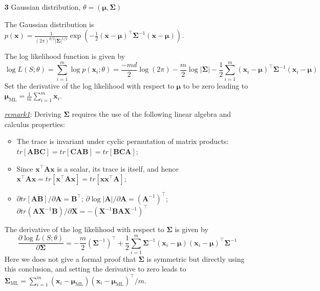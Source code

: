 \documentclass{article}
\begin{document}
\begin{itemize}
	\item [\textbf{3}] Gaussian distribution, $\theta=(\bm{\mu},\bm{\Sigma})$
	
	The Gaussian distribution is  $p(\bm{x}) = \frac{1}{(2\pi)^{d/2} |\bm{\Sigma}|^{1/2}} \exp \left( -\frac{1}{2} (\bm{x} - \bm{\mu})^\top \bm{\Sigma}^{-1} (\bm{x} - \bm{\mu})\right)$.
	
	The log likelihood function is given by
	\begin{equation*}
	\log L(S;\theta) = \sum_{i=1}^m \log p(\bm{x}_i;\theta) 
	= \frac{-md}{2} \log (2\pi) - \frac{m}{2}\log |\bm{\Sigma}| - \frac{1}{2} \sum_{i=1}^m (\bm{x}_i - \bm{\mu})^\top \bm{\Sigma}^{-1} (\bm{x}_i - \bm{\mu})
	\end{equation*}
	Set the derivative of the log likelihood with respect to $\bm{\mu}$ to be zero leading to $\bm{\mu}_{\mathrm{ML}}= \frac{1}{m} \sum_{i=1}^m \bm{x}_i$.
	
	\begin{footnotesize}
	\textit{\underline{remark1}}: Deriving $\bm{\Sigma}$ requires the use of the following linear algebra and calculus properties:	
	\begin{itemize}
	\item The trace is invariant under cyclic permutation of matrix products: $tr[\bm{A}\bm{B}\bm{C}]=tr[\bm{C}\bm{A}\bm{B}]=tr[\bm{B}\bm{C}\bm{A}]$;
	\item Since $\bm{x}^\top \bm{A} \bm{x}$ is a scalar, its trace is itself, and hence $\bm{x}^\top \bm{A} \bm{x} = tr[\bm{x}^\top \bm{A} \bm{x}] = tr[\bm{x} \bm{x}^\top \bm{A}]$;
	\item $\partial tr[\bm{A} \bm{B}]/\partial \bm{A} = \bm{B}^\top$; $\partial \log |\bm{A}|/\partial \bm{A} = (\bm{A}^{-1})^\top$; $\partial tr(\bm{A}\bm{X}^{-1}\bm{B})/\partial \bm{X} = -(\bm{X}^{-1} \bm{BA}\bm{X}^{-1})^\top$
	\end{itemize}
	\end{footnotesize}

	The derivative of the log likelihood with respect to $\bm{\Sigma}$ is given by
	\begin{equation*}
	\frac{\partial \log L(S;\theta)}{\partial \bm{\Sigma}} = -\frac{m}{2} (\bm{\Sigma}^{-1})^\top + \frac{1}{2} \sum_{i=1}^m  \bm{\Sigma}^{-1} (\bm{x}_i - \bm{\mu})(\bm{x}_i - \bm{\mu})^\top \bm{\Sigma}^{-1}
	\end{equation*}
Here we does not give a formal proof that $\bm{\Sigma}$ is symmetric but directly using this conclusion, and setting the derivative to zero leads to $\bm{\Sigma}_{\mathrm{ML}} = \sum_{i=1}^m (\bm{x}_i - \bm{\mu}_{\mathrm{ML}})(\bm{x}_i - \bm{\mu}_{\mathrm{ML}})^\top/m $.
	

\end{itemize}
\end{document}
